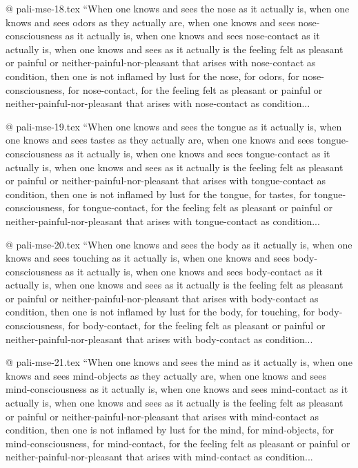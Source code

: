 @ pali-mse-18.tex
	“When one knows and sees the nose as it actually is, when one knows and sees odors as they actually are, when one knows and sees nose-consciousness as it actually is, when one knows and sees nose-contact as it actually is, when one knows and sees as it actually is the feeling felt as pleasant or painful or neither-painful-nor-pleasant that arises with nose-contact as condition, then one is not inflamed by lust for the nose, for odors, for nose-consciousness, for nose-contact, for the feeling felt as pleasant or painful or neither-painful-nor-pleasant that arises with nose-contact as condition...

@ pali-mse-19.tex
	“When one knows and sees the tongue as it actually is, when one knows and sees tastes as they actually are, when one knows and sees tongue-consciousness as it actually is, when one knows and sees tongue-contact as it actually is, when one knows and sees as it actually is the feeling felt as pleasant or painful or neither-painful-nor-pleasant that arises with tongue-contact as condition, then one is not inflamed by lust for the tongue, for tastes, for tongue-consciousness, for tongue-contact, for the feeling felt as pleasant or painful or neither-painful-nor-pleasant that arises with tongue-contact as condition...

@ pali-mse-20.tex
	“When one knows and sees the body as it actually is, when one knows and sees touching as it actually is, when one knows and sees body-consciousness as it actually is, when one knows and sees body-contact as it actually is, when one knows and sees as it actually is the feeling felt as pleasant or painful or neither-painful-nor-pleasant that arises with body-contact as condition, then one is not inflamed by lust for the body, for touching, for body-consciousness, for body-contact, for the feeling felt as pleasant or painful or neither-painful-nor-pleasant that arises with body-contact as condition...

@ pali-mse-21.tex
	“When one knows and sees the mind as it actually is, when one knows and sees mind-objects as they actually are, when one knows and sees mind-consciousness as it actually is, when one knows and sees mind-contact as it actually is, when one knows and sees as it actually is the feeling felt as pleasant or painful or neither-painful-nor-pleasant that arises with mind-contact as condition, then one is not inflamed by lust for the mind, for mind-objects, for mind-consciousness, for mind-contact, for the feeling felt as pleasant or painful or neither-painful-nor-pleasant that arises with mind-contact as condition...

